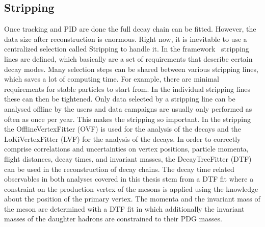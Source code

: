 
\subsection{Stripping}
\label{sec:detector:software:stripping}

Once tracking and PID are done the full decay chain can be fitted. However,
the data size after reconstruction is enormous. Right now, it is inevitable to
use a centralized selection called Stripping to handle it. In the \davinci
framework~\cite{DaVinci} stripping lines are defined, which basically are a
set of requirements that describe certain decay modes. Many selection steps
can be shared between various stripping lines, which saves a lot of computing
time. For example, there are minimal requirements for stable particles to
start from. In the individual stripping lines these can then be tightened.
Only data selected by a stripping line can be analysed offline by the users
and data campaigns are usually only performed as often as once per year. This
makes the stripping so important. In the stripping the OfflineVertexFitter
(OVF) is used for the analysis of the \BdToJPsiKS decays and the
LoKiVertexFitter (LVF) for the analysis of the \BdToDD decays. In order to
correctly comprise correlations and uncertainties on vertex positions,
particle momenta, flight distances, decay times, and invariant masses, the
\mbox{DecayTreeFitter} (DTF)~\cite{Hulsbergen:2005pu} can be used in the
reconstruction of decay chains. The decay time related observables in both
analyses covered in this thesis stem from a DTF fit where a constraint on the
production vertex of the \Bd mesons is applied using the knowledge about the
position of the primary vertex. The momenta and the invariant mass of the \Bd
meson are determined with a DTF fit in which additionally the invariant masses
of the daughter hadrons are constrained to their PDG masses.